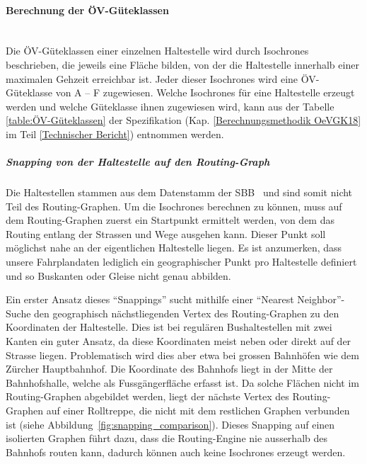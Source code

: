 \paragraph{Berechnung der ÖV-Güteklassen}~\\
Die \acs{ÖV}-Güteklassen einer einzelnen Haltestelle wird durch \glspl{Isochrone} beschrieben, die jeweils eine Fläche bilden, von der die Haltestelle innerhalb einer maximalen Gehzeit erreichbar ist.
Jeder dieser \glspl{Isochrone} wird eine \acs{ÖV}-Güteklasse von A -- F zugewiesen.
Welche \glspl{Isochrone} für eine Haltestelle erzeugt werden und welche Güteklasse ihnen zugewiesen wird, kann aus der Tabelle \ref{table:ÖV-Güteklassen} der Spezifikation (Kap. \ref{Berechnungsmethodik OeVGK18} im Teil \ref{Technischer Bericht}) entnommen werden.

\subparagraph{Snapping von der Haltestelle auf den Routing-Graph}
Die Haltestellen stammen aus dem Datenstamm der SBB~\cite{sbb_hafas_spec} und sind somit nicht Teil des Routing-Graphen. 
Um die \glspl{Isochrone} berechnen zu können, muss auf dem Routing-Graphen zuerst ein Startpunkt ermittelt werden, von dem das Routing entlang der Strassen und Wege ausgehen kann.
Dieser Punkt soll möglichst nahe an der eigentlichen Haltestelle liegen.
Es ist anzumerken, dass unsere Fahrplandaten lediglich ein geographischer Punkt pro Haltestelle definiert und so Buskanten oder Gleise nicht genau abbilden.

Ein erster Ansatz dieses "`Snappings"' sucht mithilfe einer "`Nearest Neighbor"'-Suche den geographisch nächstliegenden Vertex des Routing-Graphen zu den Koordinaten der Haltestelle.
Dies ist bei regulären Bushaltestellen mit zwei Kanten ein guter Ansatz, da diese Koordinaten meist neben oder direkt auf der Strasse liegen.
Problematisch wird dies aber etwa bei grossen Bahnhöfen wie dem Zürcher Hauptbahnhof.
Die Koordinate des Bahnhofs liegt in der Mitte der Bahnhofshalle, welche als Fussgängerfläche erfasst ist.
Da solche Flächen nicht im Routing-Graphen abgebildet werden, liegt der nächste Vertex des Routing-Graphen auf einer Rolltreppe, die nicht mit dem restlichen Graphen verbunden ist (siehe Abbildung~\ref{fig:snapping_comparison}).
Dieses Snapping auf einen isolierten Graphen führt dazu, dass die Routing-Engine nie ausserhalb des Bahnhofs routen kann, dadurch können auch keine \glspl{Isochrone} erzeugt werden.


